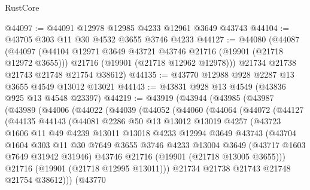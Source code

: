 \begin{lexlean}{RustCore}
\begin{coremodule}
@44097 := @44091 @12978 @12985 @4233 @12961 @3649 @43743
@44104 := @43705 @303 @11 @30 @4532 @3655 @3746 @4233
@44127 := @44080
    (@44087
      (@44097
        (@44104 @12971 @3649 @43721 @43746 @21716 (@19901 (@21718 @12972 @3655)))
        @21716
        (@19901 (@21718 @12962 @12978)))
      @21734
      @21738
      @21743
      @21748
      @21754
      @38612)
@44135 := @43770 @12988 @928 @2287 @13 @3655 @4549 @13012 @13021
@44143 := @43831 @928 @13 @4549 (@43836 @925 @13 @4548 @23397)
@44219 := @43919
    (@43944
      (@43985
        (@43987
          (@43989
            (@44006
              (@44022
                (@44039
                  (@44052
                    (@44060
                      (@44064
                        (@44072
                          (@44127
                            (@44135
                              @44143
                              (@44081
                                @2286
                                @50
                                @13
                                @13012
                                @13019
                                @4257
                                (@43723
                                  @1606
                                  @11
                                  @49
                                  @4239
                                  @13011
                                  @13018
                                  @4233
                                  @12994
                                  @3649
                                  @43743
                                  (@43704
                                    @1604
                                    @303
                                    @11
                                    @30
                                    @7649
                                    @3655
                                    @3746
                                    @4233
                                    @13004
                                    @3649
                                    (@43717 @1603 @7649 @31942 @31946)
                                    @43746
                                    @21716
                                    (@19901 (@21718 @13005 @3655)))
                                  @21716
                                  (@19901 (@21718 @12995 @13011)))
                                @21734
                                @21738
                                @21743
                                @21748
                                @21754
                                @38612)))
                          (@43770

\end{coremodule}
\end{lexlean}
